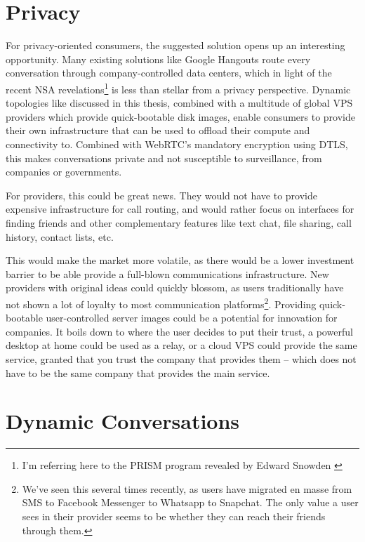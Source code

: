 \section{Privacy}

For privacy-oriented consumers, the suggested solution opens up an interesting opportunity. Many existing solutions like Google Hangouts route every conversation through company-controlled data centers, which in light of the recent NSA revelations\footnote{I'm referring here to the PRISM program revealed by Edward Snowden \cite{prism}} is less than stellar from a privacy perspective. Dynamic topologies like discussed in this thesis, combined with a multitude of global VPS providers which provide quick-bootable disk images, enable consumers to provide their own infrastructure that can be used to offload their compute and connectivity to. Combined with WebRTC's mandatory encryption using DTLS, this makes conversations private and not susceptible to surveillance, from companies or governments.

For providers, this could be great news. They would not have to provide expensive infrastructure for call routing, and would rather focus on interfaces for finding friends and other complementary features like text chat, file sharing, call history, contact lists, etc.

This would make the market more volatile, as there would be a lower investment barrier to be able provide a full-blown communications infrastructure. New providers with original ideas could quickly blossom, as users traditionally have not shown a lot of loyalty to most communication platforms\footnote{We've seen this several times recently, as users have migrated en masse from SMS to Facebook Messenger to Whatsapp to Snapchat. The only value a user sees in their provider seems to be whether they can reach their friends through them.}. Providing quick-bootable user-controlled server images could be a potential for innovation for companies. It boils down to where the user decides to put their trust, a powerful desktop at home could be used as a relay, or a cloud VPS could provide the same service, granted that you trust the company that provides them -- which does not have to be the same company that provides the main service.


\section{Dynamic Conversations}\label{sec:dynamic-conversations}

